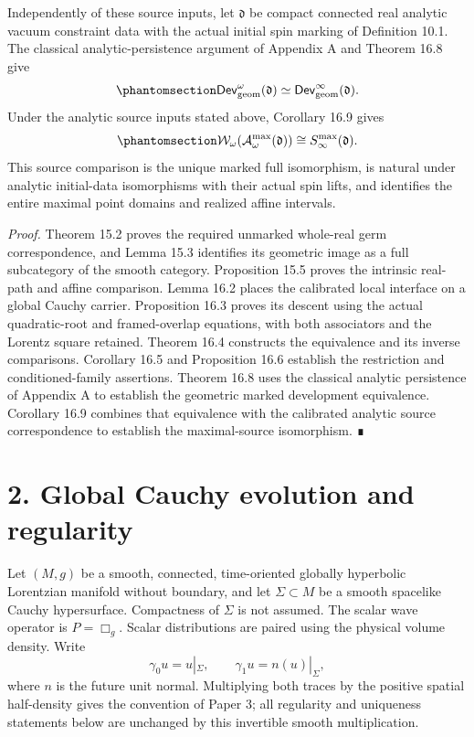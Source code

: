 \documentclass[
  english,
  11pt,
  reqno]{amsart}
\begin{document}
Independently of these source inputs, let \(\mathfrak d\) be compact
connected real analytic vacuum constraint data with the actual initial
spin marking of Definition 10.1. The classical analytic-persistence
argument of Appendix A and Theorem 16.8 give
\begin{equation}\protect\phantomsection\label{eq:analytic-development-equivalence-overview}{
\mathsf{Dev}^{\omega}_{\mathrm{geom}}(\mathfrak d)
\simeq\mathsf{Dev}^{\infty}_{\mathrm{geom}}(\mathfrak d).
}\end{equation} Under the analytic source inputs stated above, Corollary
16.9 gives
\begin{equation}\protect\phantomsection\label{eq:analytic-terminal-isomorphism-overview}{
\mathcal W_\omega(\mathcal A^{\max}_\omega(\mathfrak d))
\cong S^{\max}_\infty(\mathfrak d).
}\end{equation} This source comparison is the unique marked full
isomorphism, is natural under analytic initial-data isomorphisms with
their actual spin lifts, and identifies the entire maximal point domains
and realized affine intervals.

\emph{Proof.} Theorem 15.2 proves the required unmarked whole-real germ
correspondence, and Lemma 15.3 identifies its geometric image as a full
subcategory of the smooth category. Proposition 15.5 proves the
intrinsic real-path and affine comparison. Lemma 16.2 places the
calibrated local interface on a global Cauchy carrier. Proposition 16.3
proves its descent using the actual quadratic-root and framed-overlap
equations, with both associators and the Lorentz square retained.
Theorem 16.4 constructs the equivalence and its inverse comparisons.
Corollary 16.5 and Proposition 16.6 establish the restriction and
conditioned-family assertions. Theorem 16.8 uses the classical analytic
persistence of Appendix A to establish the geometric marked development
equivalence. Corollary 16.9 combines that equivalence with the
calibrated analytic source correspondence to establish the
maximal-source isomorphism. ∎

\protect{}\label{sec:global-cauchy-regularity}

\section{2. Global Cauchy evolution and
regularity}\label{global-cauchy-evolution-and-regularity}

Let \((M,g)\) be a smooth, connected, time-oriented globally hyperbolic
Lorentzian manifold without boundary, and let \(\Sigma\subset M\) be a
smooth spacelike Cauchy hypersurface. Compactness of \(\Sigma\) is not
assumed. The scalar wave operator is \(P=\Box_g\). Scalar distributions
are paired using the physical volume density. Write \[
\gamma_0u=u|_\Sigma,\qquad \gamma_1u=n(u)|_\Sigma,
\] where \(n\) is the future unit normal. Multiplying both traces by the
positive spatial half-density gives the convention of Paper 3; all
regularity and uniqueness statements below are unchanged by this
invertible smooth multiplication.
\end{document}
